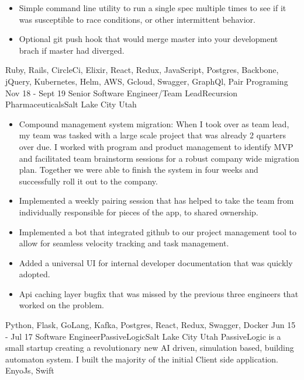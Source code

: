 \begin{experiences}
{\begin{itemize}
                        \item Simple command line utility to run a single spec multiple times to see if it was susceptible to race conditions, or other intermittent behavior.
                        \item Optional git push hook that would merge master into your development brach if master had diverged.
                      \end{itemize}
                    }
                    {Ruby, Rails, CircleCi, Elixir, React, Redux, JavaScript, Postgres, Backbone, jQuery, Kubernetes, Helm, AWS, Gcloud, Swagger, GraphQl, Pair Programing}
  \emptySeparator
  \experience
    {Nov 18 - Sept 19} {Senior Software Engineer/Team Lead}{Recursion Pharmaceuticals}{Salt Lake City Utah}
    {}    {
                      \begin{itemize}
                        \item Compound management system migration:
                        When I took over as team lead, my team was tasked with a large scale project that was already 2 quarters over due. I worked with program and product management to identify MVP and facilitated team brainstorm sessions for a robust company wide migration plan. Together we were able to finish the system in four weeks and successfully roll it out to the company.
                        \item Implemented a weekly pairing session that has helped to take the team from individually responsible for pieces of the app, to shared ownership.
                        \item Implemented a bot that integrated github to our project management tool to allow for seamless velocity tracking and task management.
                        \item Added a universal UI for internal developer documentation that was quickly adopted.
                        \item Api caching layer bugfix that was missed by the previous three engineers that worked on the problem.
                      \end{itemize}
                    }
                    {Python, Flask, GoLang, Kafka, Postgres, React, Redux, Swagger, Docker}
  \emptySeparator
  \experience
  {Jun 15 - Jul 17}  {Software Engineer}{PassiveLogic}{Salt Lake City Utah}
  {}  {PassiveLogic is a small startup creating a revolutionary new AI driven, simulation based, building automaton system. I built the majority of the initial Client side application.}
      {EnyoJs, Swift}
  \emptySeparator
\end{experiences}
